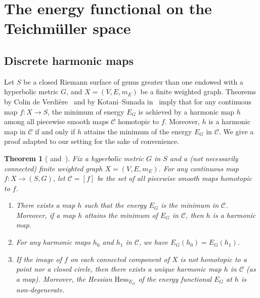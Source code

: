 \documentclass[11pt]{article}
\newtheorem{theo}{Theorem}[section]
\theoremstyle{definition}
\numberwithin{equation}{section}
\newcommand{\Cc}{\mathcal{C}}
\newcommand*\Hess{\mathrm{Hess}}
\newcommand*{\romanenumi}{\renewcommand*{\theenumi}{\roman{enumi}}}
\begin{document}
\section{The energy functional on the Teichm\"uller space}\label{Sec:energyfunctionalTc}

\subsection{Discrete harmonic maps}\label{Sec:harmonic}

Let $S$ be a closed Riemann surface of genus greater than one endowed with a hyperbolic metric $G$, and $X=(V, E, m_E)$ be a finite weighted graph. Theorems by Colin de Verdière~\cite{ColindeVerdiereComment} and by Kotani--Sunada in~\cite{KotaniSunadaStandard} imply that for any continuous map $f:X \to S$, the minimum of energy $E_G$ is achieved by a harmonic map $h$ among all piecewise smooth maps $\Cc$ homotopic to $f$. Moreover, $h$ is a harmonic map in $\Cc$ if and only if $h$ attains the minimum of the energy $E_G$ in $\Cc$. We give a proof adapted to our setting for the sake of convenience.



\begin{theo}[{\cite[Théorème~1]{ColindeVerdiereComment} and~\cite[Theorems~2.2, 2.3 and~2.5]{KotaniSunadaStandard}}]\label{Thm:KSharmonic}
Fix a hyperbolic metric $G$ in $S$ and a (not necessarily connected) finite weighted graph $X=(V, E, m_E)$. For any continuous map $f:X \to (S, G)$, let $\Cc=[f]$ be the set of all piecewise smooth maps homotopic to $f$.
\begin{enumerate}\romanenumi
\item \label{theo2.1.1} There exists a map $h$ such that the energy $E_G$ is the minimum in $\Cc$. Moreover, if a map $h$ attains the minimum of $E_G$ in $\Cc$, then $h$ is a harmonic map.
\item \label{theo2.1.2}For any harmonic maps $h_0$ and $h_1$ in $\Cc$, we have $E_G(h_0)=E_G(h_1)$.
\item \label{theo2.1.3}If the image of $f$ on each connected component of $X$ is not homotopic to a point nor a closed circle, then there exists a unique harmonic map $h$ in $\Cc$ (as a map). Moreover, the Hessian ${\Hess}_{E_G}$ of the energy functional $E_G$ at $h$ is non-degenerate.
\end{enumerate}
\end{theo}
\end{document}
